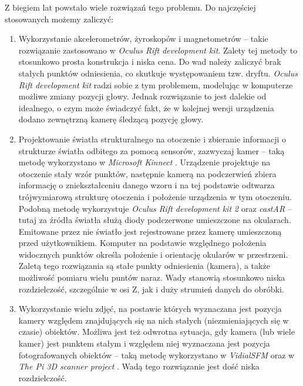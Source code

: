Z biegiem lat powstało wiele rozwiązań tego problemu. Do najczęściej stosowanych możemy zaliczyć:
\begin{enumerate}
 \item 
 Wykorzystanie akcelerometrów, żyroskopów i magnetometrów -- 
takie rozwiązanie zastosowano w \textit{Oculus Rift development kit}. Zalety tej metody to stosunkowo
prosta konstrukcja i niska cena.
Do wad należy zaliczyć brak stałych punktów odniesienia, co skutkuje występowaniem tzw. dryftu.
\textit{Oculus Rift development kit} radzi sobie z tym problemem, modelując w komputerze możliwe zmiany pozycji głowy.
Jednak rozwiązanie to jest dalekie od idealnego, o czym może świadczyć fakt, że w kolejnej wersji 
urządzenia dodano zewnętrzną kamerę śledzącą pozycję głowy.

\item \label{itm:second_method}
 Projektowanie światła strukturalnego na otoczenie i zbieranie informacji o strukturze 
 światła odbitego za pomocą sensorów, zazwyczaj kamer -- 
 taką metodę wykorzystano w \textit{Microsoft Kinnect} \cite{bib:MicrosoftKinect}.
 Urządzenie projektuje na otoczenie stały wzór punktów, następnie kamerą na podczerwień
 zbiera informację o zniekształceniu danego wzoru i na tej podstawie odtwarza  
 trójwymiarową strukturę otoczenia i położenie urządzenia w tym otoczeniu.
 Podobną metodę wykorzystuje \textit{Oculus Rift development kit 2} \cite{bib:OculusRiftDK2} oraz 
 \textit{castAR} \cite{bib:castAR} -- tutaj za źródła światła służą diody podczerwone umieszczone na okularach.
 Emitowane przez nie światło jest rejestrowane przez kamerę umieszczoną przed użytkownikiem.
 Komputer na podstawie względnego położenia widocznych punktów określa położenie i orientację
 okularów w przestrzeni.
 Zaletą tego rozwiązania są stałe punkty odniesienia (kamera), a także możliwość pomiaru wielu puntów naraz.
 Wady stanowią stosunkowo niska rozdzielczość, szczególnie w osi Z, jak i duży strumień danych do obróbki.

\item
 Wykorzystanie wielu zdjęć, na postawie których 
 wyznaczana jest pozycja kamery względem znajdujących się na nich  stałych (niezmieniających się w czasie) obiektów. 
 Możliwa jest też odwrotna sytuacja, gdy  
  kamera (lub wiele kamer) jest punktem stałym i względem niej wyznaczana jest pozycja fotografowanych obiektów --   
 taką metodę wykorzystano w \textit{VidialSFM} \cite{bib:VisualSFM} oraz w \textit{The Pi 3D scanner project} \cite{bib:pi3dscan}. 
 Wadą tego rozwiązanie jest dość niska rozdzielczość.
 

\end{enumerate}
